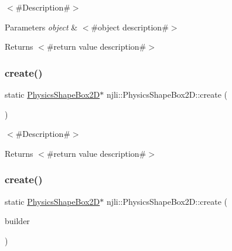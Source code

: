 $<$\#\+Description\#$>$


\begin{DoxyParams}{Parameters}
{\em object} & $<$\#object description\#$>$\\
\hline
\end{DoxyParams}
\begin{DoxyReturn}{Returns}
$<$\#return value description\#$>$ 
\end{DoxyReturn}
\mbox{\label{classnjli_1_1_physics_shape_box2_d_a51f4d02cf43ee6927f982a93607e2655}} 
\subsubsection{\texorpdfstring{create()}{create()}\hspace{0.1cm}{\footnotesize\ttfamily [1/2]}}
{\footnotesize\ttfamily static \mbox{\hyperlink{classnjli_1_1_physics_shape_box2_d}{Physics\+Shape\+Box2D}}$\ast$ njli\+::\+Physics\+Shape\+Box2\+D\+::create (\begin{DoxyParamCaption}{ }\end{DoxyParamCaption})\hspace{0.3cm}{\ttfamily [static]}}

$<$\#\+Description\#$>$

\begin{DoxyReturn}{Returns}
$<$\#return value description\#$>$ 
\end{DoxyReturn}
\mbox{\label{classnjli_1_1_physics_shape_box2_d_aea37ab0a015b2ea5c7960469a762cf18}} 
\subsubsection{\texorpdfstring{create()}{create()}\hspace{0.1cm}{\footnotesize\ttfamily [2/2]}}
{\footnotesize\ttfamily static \mbox{\hyperlink{classnjli_1_1_physics_shape_box2_d}{Physics\+Shape\+Box2D}}$\ast$ njli\+::\+Physics\+Shape\+Box2\+D\+::create (\begin{DoxyParamCaption}\item[{const \mbox{\hyperlink{classnjli_1_1_physics_shape_box2_d_builder}{Physics\+Shape\+Box2\+D\+Builder}} \&}]{builder }\end{DoxyParamCaption})\hspace{0.3cm}{\ttfamily [static]}}

